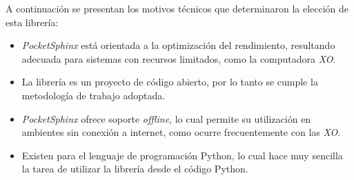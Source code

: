 A continuaci\'on se presentan los motivos t\'ecnicos que determinaron la elecci\'on de esta librer\'ia:

\begin{itemize}
    \item \emph{PocketSphinx} est\'a orientada a la optimizaci\'on del rendimiento, resultando adecuada 
    para sistemas con recursos limitados, como la computadora \emph{XO}.
    \item La librer\'ia es un proyecto de c\'odigo abierto, por lo tanto se cumple la metodolog\'ia 
    de trabajo adoptada.
    \item \emph{PocketSphinx} ofrece soporte \emph{offline}, lo cual permite su utilizaci\'on en ambientes
    sin conexi\'on a internet, como ocurre frecuentemente con las \emph{XO}.
    \item Existen  para el lenguaje de programaci\'on Python, lo cual hace muy 
    sencilla la tarea de utilizar la librer\'ia desde el c\'odigo Python.
\end{itemize}
